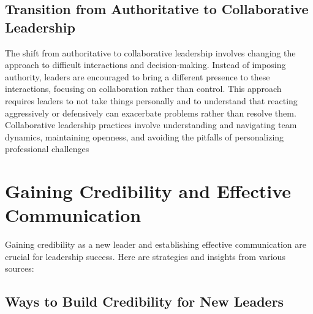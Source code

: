 \documentclass[runningheads]{llncs}
\begin{document}
\subsection{Transition from Authoritative to Collaborative Leadership}

The shift from authoritative to collaborative leadership involves changing the approach to difficult interactions and decision-making. Instead of imposing authority, leaders are encouraged to bring a different presence to these interactions, focusing on collaboration rather than control. This approach requires leaders to not take things personally and to understand that reacting aggressively or defensively can exacerbate problems rather than resolve them. Collaborative leadership practices involve understanding and navigating team dynamics, maintaining openness, and avoiding the pitfalls of personalizing professional challenges

\section{Gaining Credibility and Effective Communication}

Gaining credibility as a new leader and establishing effective communication are crucial for leadership success. Here are strategies and insights from various sources:

\subsection{Ways to Build Credibility for New Leaders}
\end{document}
